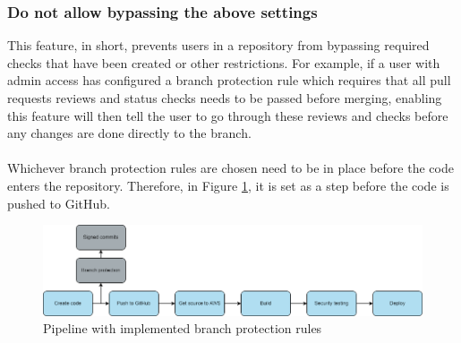 \subsubsection{Do not allow bypassing the above settings}
This feature, in short, prevents users in a repository from bypassing required checks that have been created or other restrictions. For example, if a user with admin access has configured a branch protection rule which requires that all pull requests reviews and status checks needs to be passed before merging, enabling this feature will then tell the user to go through these reviews and checks before any changes are done directly to the branch. 
\\~\\
Whichever branch protection rules are chosen need to be in place before the code enters the repository. Therefore, in Figure \ref{fig: Pipeline with implemented branch protection rules}, it is set as a step before the code is pushed to GitHub. 
\vspace{2mm}
\begin{figure}[H]
    \centering
    \includegraphics[width=0.8\columnwidth]{Images/pipeline6.png}
    \caption{Pipeline with implemented branch protection rules}
    \label{fig: Pipeline with implemented branch protection rules}
\end{figure}

